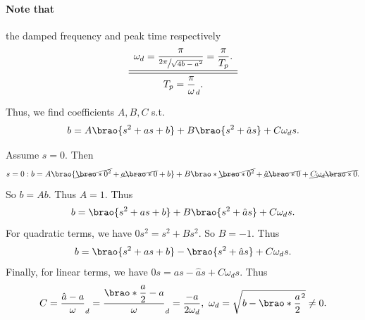 \documentclass[12pt]{article}
\DeclarePairedDelimiter\brao()%
\begin{document}
\begin{enumerate}[(a)]
        \paragraph{Note that} the damped frequency and peak time respectively
        \begin{equation}\label{eq: w to-from Tp}
            \begin{array}{c}
            \displaystyle
                \omega_d = \frac\pi{\sfrac{2\pi}{\sqrt{4b - a^2}}} = \frac\pi{T_p}.
            \\*
            \midrule\midrule
            \displaystyle
                T_p = \frac\pi\omega_d.
            \\*
            \end{array}
        \end{equation}

        Thus, we find coefficients $A,B,C$ s.t.
        \begin{equation}
            b = A\brao{s^2 + as + b} + B\brao{s^2 + \hat{a}s} + C\omega_d s.
        \end{equation}

        Assume $s = 0$. Then
        \begin{equation}
            s = 0: b = A\brao{\cancel{\brao*0^2} + \cancel{a\brao*0} + b} + B\brao*{\cancel{\brao*0^2} + \cancel{\hat{a}\brao*0}} + \cancel{C\omega_d \brao*0}.
        \end{equation}
        So $b = Ab$. Thus $A = 1$. Thus
        \begin{equation}
            b = \brao{s^2 + as + b} + B\brao{s^2 + \hat{a}s} + C\omega_d s.
        \end{equation}
        For quadratic terms, we have $0s^2 = s^2 + Bs^2$. So $B = -1$. Thus
        \begin{equation}
            b = \brao{s^2 + as + b} - \brao{s^2 + \hat{a}s} + C\omega_d s.
        \end{equation}
        Finally, for linear terms, we have $0s = as - \hat{a}s + C\omega_d s$. Thus
        \begin{equation}
            C = \frac{\hat{a} - a}\omega_d
            = \frac{\displaystyle\brao*{\frac{a}2} - a}\omega_d
            = \frac{-a}{2\omega_d},\ 
            \omega_d = \sqrt{b - \brao*{\frac{a}2}^2} \not= 0.
        \end{equation}


\end{enumerate}
\end{document}
